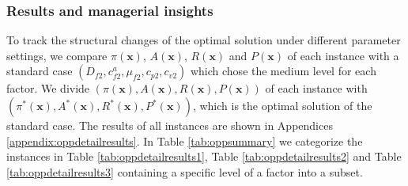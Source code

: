 \documentclass[preprint,12pt]{elsarticle}
\begin{document}
\subsubsection{Results and managerial insights}
To track the structural changes of the optimal solution under different parameter settings, we compare $\pi(\boldsymbol{x})$, $A(\boldsymbol{x})$, $R(\boldsymbol{x})$ and $P(\boldsymbol{x})$ of each instance with a standard case $(D_{f2}, c^{a}_{f2}, \mu_{f2}, c_{p2},c_{v2})$ which chose the medium level for each factor. We divide $(\pi(\boldsymbol{x}), A(\boldsymbol{x}), R(\boldsymbol{x}), P(\boldsymbol{x}))$ of each instance with $(\pi^{*}(\boldsymbol{x}), A^{*}(\boldsymbol{x}), R^{*}(\boldsymbol{x}), P^{*}(\boldsymbol{x}))$, which is the optimal solution of the standard case. The results of all instances are shown in Appendices \ref{appendix:oppdetailresults}. In Table \ref{tab:oppsummary} we categorize the instances in Table \ref{tab:oppdetailresults1}, Table \ref{tab:oppdetailresults2} and Table \ref{tab:oppdetailresults3} containing a specific level of a factor into a subset.
\end{document}
